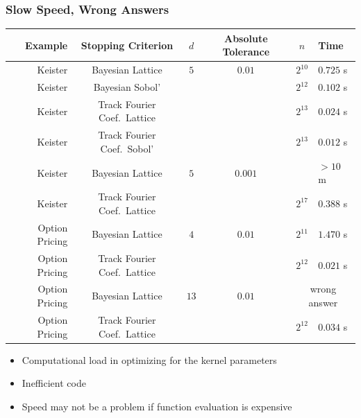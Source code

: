 \documentclass[11pt,compress,xcolor={usenames,dvipsnames},aspectratio=169]{beamer}
\begin{document}
\begin{frame}\frametitle{Slow Speed, Wrong Answers \href{https://colab.research.google.com/drive/1KrlrtLu7j8Ff7YsSJjPMiGUr-UKfqwxm?usp=sharing}{}}
{\small 
\vspace{-3ex}
\begin{center}
\begin{tabular}{rccccl}
	Example & Stopping Criterion & $d$ & Absolute Tolerance & $n$ & Time \\ \toprule
	Keister & Bayesian Lattice \cite{RatHic19a} & $5$ & $0.01$ & $2^{10}$ & $0.725$ s \\
	Keister & Bayesian Sobol' \cite{JagHic22a} &&&  $2^{12}$ & $0.102$ s \\
	Keister & Track Fourier Coef.\ Lattice \cite{JimHic16a} &&& $2^{13}$ & $0.024$ s \\
	Keister & Track Fourier Coef.\  Sobol' \cite{HicJim16a} &&& $2^{13}$ & $0.012$ s \\ \midrule
	Keister & Bayesian Lattice \cite{RatHic19a} & $5$ & $0.001$ &  & \alert{$> 10$ m} \\
	Keister & Track Fourier Coef.\ Lattice \cite{JimHic16a} &&& $2^{17}$ & $0.388$ s \\ \toprule
Option Pricing  & Bayesian Lattice \cite{RatHic19a} & $4$ & $0.01$ & $2^{11}$ & $1.470$ s \\
Option Pricing  & Track Fourier Coef.\ Lattice \cite{JimHic16a} &&& $2^{12}$ & $0.021$ s \\ \midrule
Option Pricing  & Bayesian Lattice \cite{RatHic19a} & $13$ & $0.01$ & \multicolumn{2}{c}{\alert{wrong answer}}\\
Option Pricing  & Track Fourier Coef.\ Lattice \cite{JimHic16a} &&& $2^{12}$ & $0.034$ s \\ \bottomrule
\end{tabular}
\end{center}
\vspace{-3ex}
\begin{itemize}
	\setlength{\itemsep}{-0.5ex}
	\item Computational load in \alert{optimizing} for the kernel parameters
	\item \alert{Inefficient} code
	\item Speed may not be a problem if function evaluation is \alert{expensive}
\end{itemize}
}
\end{frame}
\end{document}
